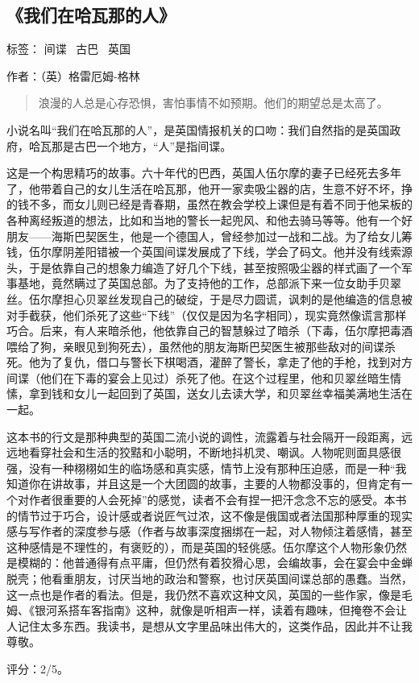 \subsection{《我们在哈瓦那的人》}

标签： 间谍 \ 古巴 \ 英国

作者：（英）格雷厄姆-格林

\begin{quotation}
浪漫的人总是心存恐惧，害怕事情不如预期。他们的期望总是太高了。
\end{quotation}

小说名叫“我们在哈瓦那的人”，是英国情报机关的口吻：我们自然指的是英国政府，哈瓦那是古巴一个地方，“人”是指间谍。

这是一个构思精巧的故事。六十年代的巴西，英国人伍尔摩的妻子已经死去多年了，他带着自己的女儿生活在哈瓦那，他开一家卖吸尘器的店，生意不好不坏，挣的钱不多，而女儿则已经是青春期，虽然在教会学校上课但是有着不同于他呆板的各种离经叛道的想法，比如和当地的警长一起兜风、和他去骑马等等。他有一个好朋友——海斯巴契医生，他是一个德国人，曾经参加过一战和二战。为了给女儿筹钱，伍尔摩阴差阳错被一个英国间谍发展成了下线，学会了码文。他并没有线索源头，于是依靠自己的想象力编造了好几个下线，甚至按照吸尘器的样式画了一个军事基地，竟然瞒过了英国总部。为了支持他的工作，总部派下来一位女助手贝翠丝。伍尔摩担心贝翠丝发现自己的破绽，于是尽力圆谎，讽刺的是他编造的信息被对手截获，他们杀死了这些“下线”（仅仅是因为名字相同），现实竟然像谎言那样巧合。后来，有人来暗杀他，他依靠自己的智慧躲过了暗杀（下毒，伍尔摩把毒酒喂给了狗，亲眼见到狗死去），虽然他的朋友海斯巴契医生被那些敌对的间谍杀死。他为了复仇，借口与警长下棋喝酒，灌醉了警长，拿走了他的手枪，找到对方间谍（他们在下毒的宴会上见过）杀死了他。在这个过程里，他和贝翠丝暗生情愫，拿到钱和女儿一起回到了英国，送女儿去读大学，和贝翠丝幸福美满地生活在一起。

这本书的行文是那种典型的英国二流小说的调性，流露着与社会隔开一段距离，远远地看穿社会和生活的狡黠和小聪明，不断地抖机灵、嘲讽。人物呢则面具感很强，没有一种栩栩如生的临场感和真实感，情节上没有那种压迫感，而是一种“我知道你在讲故事，并且这是一个大团圆的故事，主要的人物都没事的，但肯定有一个对作者很重要的人会死掉”的感觉，读者不会有捏一把汗念念不忘的感受。本书的情节过于巧合，设计感或者说匠气过浓，这不像是俄国或者法国那种厚重的现实感与写作者的深度参与感（作者与故事深度捆绑在一起，对人物倾注着感情，甚至这种感情是不理性的，有褒贬的），而是英国的轻佻感。伍尔摩这个人物形象仍然是模糊的：他普通得有点平庸，但仍然有着狡猾心思，会编故事，会在宴会中金蝉脱壳；他看重朋友，讨厌当地的政治和警察，也讨厌英国间谍总部的愚蠢。当然，这一点也是作者的看法。但是，我仍然不喜欢这种文风，英国的一些作家，像是毛姆、《银河系搭车客指南》这种，就像是听相声一样，读着有趣味，但掩卷不会让人记住太多东西。我读书，是想从文字里品味出伟大的，这类作品，因此并不让我尊敬。

评分：2/5。